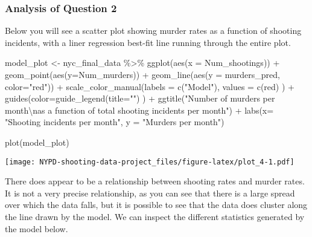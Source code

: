 \documentclass[
]{article}
\newenvironment{Shaded}{\begin{snugshade}}{\end{snugshade}}
\newcommand{\AttributeTok}[1]{\textcolor[rgb]{0.77,0.63,0.00}{#1}}
\newcommand{\FunctionTok}[1]{\textcolor[rgb]{0.00,0.00,0.00}{#1}}
\newcommand{\NormalTok}[1]{#1}
\newcommand{\OtherTok}[1]{\textcolor[rgb]{0.56,0.35,0.01}{#1}}
\newcommand{\SpecialCharTok}[1]{\textcolor[rgb]{0.00,0.00,0.00}{#1}}
\newcommand{\StringTok}[1]{\textcolor[rgb]{0.31,0.60,0.02}{#1}}
\begin{document}
\hypertarget{analysis-of-question-2}{%
\subsubsection{Analysis of Question 2}\label{analysis-of-question-2}}

Below you will see a scatter plot showing murder rates as a function of
shooting incidents, with a liner regression best-fit line running
through the entire plot.

\begin{Shaded}
\begin{Highlighting}[]
\NormalTok{model\_plot }\OtherTok{\textless{}{-}}\NormalTok{ nyc\_final\_data }\SpecialCharTok{\%\textgreater{}\%} \FunctionTok{ggplot}\NormalTok{(}\FunctionTok{aes}\NormalTok{(}\AttributeTok{x =}\NormalTok{ Num\_shootings)) }\SpecialCharTok{+} \FunctionTok{geom\_point}\NormalTok{(}\FunctionTok{aes}\NormalTok{(}\AttributeTok{y=}\NormalTok{Num\_murders)) }\SpecialCharTok{+} \FunctionTok{geom\_line}\NormalTok{(}\FunctionTok{aes}\NormalTok{(}\AttributeTok{y =}\NormalTok{ murders\_pred, }\AttributeTok{color=}\StringTok{"red"}\NormalTok{)) }\SpecialCharTok{+} \FunctionTok{scale\_color\_manual}\NormalTok{(}\AttributeTok{labels =} \FunctionTok{c}\NormalTok{(}\StringTok{"Model"}\NormalTok{), }\AttributeTok{values =} \FunctionTok{c}\NormalTok{(}\StringTok{\textquotesingle{}red\textquotesingle{}}\NormalTok{) ) }\SpecialCharTok{+} \FunctionTok{guides}\NormalTok{(}\AttributeTok{color=}\FunctionTok{guide\_legend}\NormalTok{(}\AttributeTok{title=}\StringTok{""}\NormalTok{) ) }\SpecialCharTok{+} \FunctionTok{ggtitle}\NormalTok{(}\StringTok{"Number of murders per month}\SpecialCharTok{\textbackslash{}n}\StringTok{as a function of total shooting incidents per month"}\NormalTok{) }\SpecialCharTok{+} \FunctionTok{labs}\NormalTok{(}\AttributeTok{x=} \StringTok{"Shooting incidents per month"}\NormalTok{, }\AttributeTok{y =} \StringTok{"Murders per month"}\NormalTok{)}

\FunctionTok{plot}\NormalTok{(model\_plot)}
\end{Highlighting}
\end{Shaded}

\texttt{[image: NYPD-shooting-data-project\_files/figure-latex/plot\_4-1.pdf]}

There does appear to be a relationship between shooting rates and murder
rates. It is not a very precise relationship, as you can see that there
is a large spread over which the data falls, but it is possible to see
that the data does cluster along the line drawn by the model. We can
inspect the different statistics generated by the model below.
\end{document}
